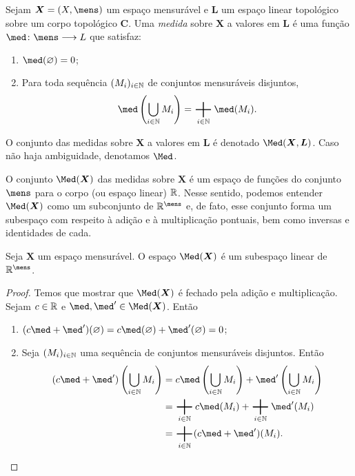 \begin{defi}
Sejam $\bm X = (X,\mens)$ um espaço mensurável e $\bm L$ um espaço linear topológico sobre um corpo topológico $\bm C$. Uma \emph{medida} sobre $\bm X$ a valores em $\bm L$ é uma função $\med\colon \mens \to L$ que satisfaz:
	\begin{enumerate}
	\item $\med(\emptyset) = 0$;
	\item Para toda sequência $(M_i)_{i \in \mathbb{N}}$ de conjuntos mensuráveis disjuntos,
		\begin{equation*}
		\med\left( \bigcup_{i \in \N} M_i \right) = \sum_{i \in \N} \med(M_i).
		\end{equation*}
	\end{enumerate}
O conjunto das medidas sobre $\bm X$ a valores em $\bm L$ é denotado $\Med(\bm X,\bm L)$. Caso não haja ambiguidade, denotamos $\Med$.
\end{defi}

O conjunto $\Med(\bm X)$ das medidas sobre $\bm X$ é um espaço de funções do conjunto $\mens$ para o corpo (ou espaço linear) $\mathbb{R}$. Nesse sentido, podemos entender $\Med(\bm X)$ como um subconjunto de $\R^\mens$ e, de fato, esse conjunto forma um subespaço com respeito à adição e à multiplicação pontuais, bem como inversas e identidades de cada.

\begin{prop}
Seja $\bm X$ um espaço mensurável. O espaço $\Med(\bm X)$ é um subespaço linear de $\R^\mens$.
\end{prop}
\begin{proof}
Temos que mostrar que $\Med(\bm X)$ é fechado pela adição e multiplicação. Sejam $c \in \mathbb{R}$ e $\med,\med' \in \Med(\bm X)$. Então
	\begin{enumerate}
	\item $(c\med+\med')(\emptyset) = c\med(\emptyset)+\med'(\emptyset) = 0$;
	\item Seja $(M_i)_{i \in \mathbb{N}}$ uma sequência de conjuntos mensuráveis disjuntos. Então
		\begin{align*}
		(c\med+\med')\left( \bigcup_{i \in \N} M_i \right) &= c\med\left( \bigcup_{i \in \N} M_i \right) + \med'\left( \bigcup_{i \in \N} M_i \right) \\
			&= \sum_{i \in \N} c\med(M_i) + \sum_{i \in \N} \med'(M_i) \\
			&= \sum_{i \in \N} (c\med+\med')(M_i).
		\end{align*}
	\end{enumerate}
\end{proof}

